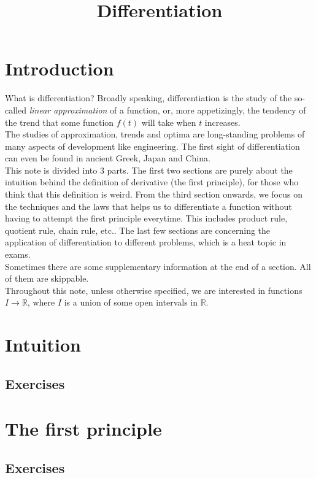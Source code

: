\documentclass{fts_m2}
\title{Differentiation}
\begin{document}
    \maketitle\clearpage
    \section*{Introduction}
    What is differentiation? Broadly speaking, differentiation is the study of the so-called \textit{linear approximation} of a function, or, more appetizingly, the tendency of the trend that some function $f(t)$ will take when $t$ increases.\\
    The studies of approximation, trends and optima are long-standing problems of many aspects of development like engineering.
    The first sight of differentiation can even be found in ancient Greek, Japan and China.\\
    This note is divided into 3 parts.
    The first two sections are purely about the intuition behind the definition of derivative (the first principle), for those who think that this definition is weird.
    From the third section onwards, we focus on the techniques and the laws that helps us to differentiate a function without having to attempt the first principle everytime.
    This includes product rule, quotient rule, chain rule, etc..
    The last few sections are concerning the application of differentiation to different problems, which is a heat topic in exams.\\
    Sometimes there are some supplementary information at the end of a section. All of them are skippable.\\
    Throughout this note, unless otherwise specified, we are interested in functions $I\to\mathbb R$, where $I$ is a union of some open intervals in $\mathbb R$.

    \section{Intuition}
    
    \subsection*{Exercises}
      
    
    \section{The first principle}
    
    \subsection*{Exercises}
    
\end{document}
